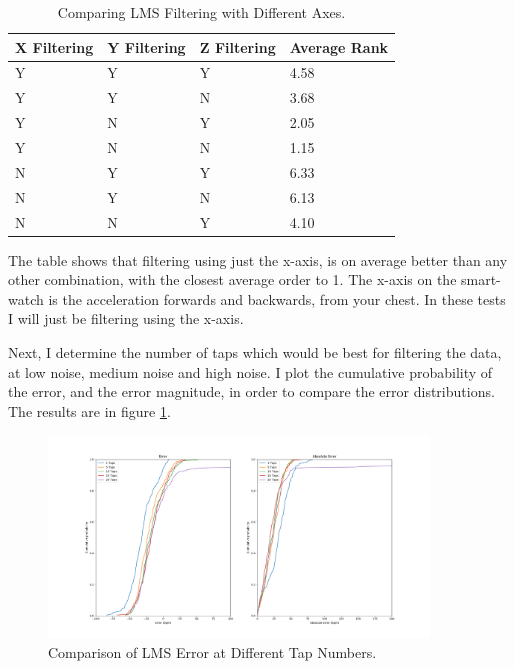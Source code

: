\documentclass[12pt,a4paper,twoside,openright]{report}
\begin{document}
\begin{table}[]
\centering
\caption{Comparing LMS Filtering with Different Axes.}
\label{table:lms-errors}
\begin{tabular}{|l|l|l|l|}
\hline
X Filtering & Y Filtering & Z Filtering & Average Rank \\ \hline
Y           & Y           & Y           & 4.58          \\
Y           & Y           & N           & 3.68          \\
Y           & N           & Y           & 2.05          \\
Y           & N           & N           & 1.15          \\
N           & Y           & Y           & 6.33          \\
N           & Y           & N           & 6.13          \\
N           & N           & Y           & 4.10          \\
\hline
\end{tabular}
\end{table}

The table shows that filtering using just the x-axis, is on average better
than any other combination, with the closest average order to 1. The x-axis on
the smart-watch is the acceleration forwards and backwards, from your chest.
In these tests I will just be filtering using the x-axis.

Next, I determine the number of taps which would be best for filtering the
data, at low noise, medium noise and high noise. I plot the cumulative
probability of the error, and the error magnitude, in order to compare
the error distributions. The results are in figure \ref{fig:lms-medium}.

\begin{figure}[tbh]
	\centerline{\includegraphics[width=0.9\textwidth]{figs/lms-taps-error-medium-noise.png}}
	\caption{Comparison of LMS Error at Different Tap Numbers.}
	\label{fig:lms-medium}
\end{figure}
\end{document}
